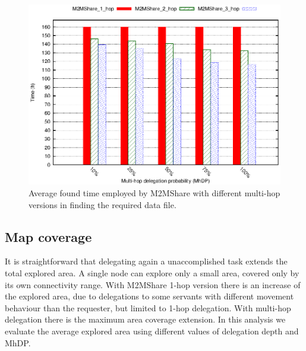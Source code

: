 \begin{figure}[htpb]
  \begin{center}
    \includegraphics{grafici/tempiVF_MultiHop.eps}
    \caption{Average found time employed by M2MShare with different multi-hop versions in finding the required data file.}
    \label{fig:tempiVF_MultiHop}
  \end{center}
\end{figure}


\newpage
\subsection{Map coverage}
It is straightforward that delegating again a unaccomplished task extends the total explored area. A single node can explore only a small area, covered only by its own connectivity range. With M2MShare 1-hop version there is an increase of the explored area, due to delegations to some servants with different movement behaviour than the requester, but limited to 1-hop delegation. With multi-hop delegation there is the maximum area coverage extension. In this analysis we evaluate the average explored area using different values of delegation depth and MhDP.
\\

